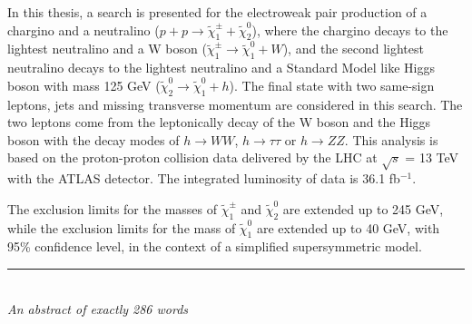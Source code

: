 In this thesis, a search is presented for the electroweak pair production of a chargino and a neutralino ($p + p \rightarrow \tilde{\chi}_1^\pm + \tilde{\chi}_2^0$),
where the chargino decays to the lightest neutralino and a W boson ($\tilde{\chi}_1^\pm \rightarrow \tilde{\chi}_1^0 + W$),
and the second lightest neutralino decays to the lightest neutralino and a Standard Model like Higgs boson with mass 125 GeV ($\tilde{\chi}_2^0 \rightarrow \tilde{\chi}_1^0 + h$).
The final state with two same-sign leptons, jets and missing transverse momentum are considered in this search.
The two leptons come from the leptonically decay of the W boson and the Higgs boson with the decay modes of  $h \rightarrow WW$, $h \rightarrow \tau \tau$ or $h \rightarrow ZZ$.
This analysis is based on the proton-proton collision data delivered by the LHC at $\sqrt{s}$ = 13 TeV with the ATLAS detector.
The integrated luminosity of data is 36.1 fb$^{-1}$.

The exclusion limits for the masses of $\tilde{\chi}_1^\pm$ and $\tilde{\chi}_2^0$ are extended up to 245 GeV, while the exclusion limits for the mass of $\tilde{\chi}_1^0$ are extended up to 40 GeV, with 95\% confidence level, in the context of a simplified supersymmetric model.

\bigskip

\begin{center}

\rule{6cm}{0.025cm}\\
{\slshape An abstract of exactly 286 words}

\end{center}
